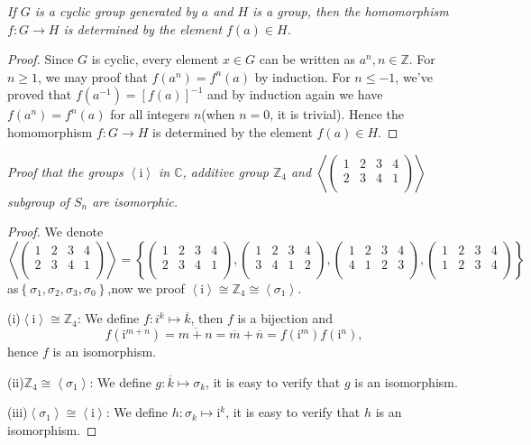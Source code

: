\begin{problem}\em
If $G$ is a cyclic group generated by $a$ and $H$ is a group, then the homomorphism $f:G\to H$ is determined by the element $f(a)\in H$.
\end{problem}
\begin{proof}
Since $G$ is cyclic, every element $x\in G$ can be written as $a^n,n\in\mathbb{Z}$. For $n\ge 1$, we may proof that $f(a^n)=f^n(a)$ by induction. For $n\le -1$, we've proved that $f(a^{-1})=[f(a)]^{-1}$ and by induction again we have $f(a^n)=f^n(a)$ for all integers $n$(when $n=0$, it is trivial). Hence the homomorphism $f:G\to H$ is determined by the element $f(a)\in H$.
\end{proof}
\begin{problem}\em
Proof that the groups $\left<\mathrm{i}\right>$ in $\mathbb{C}$, additive group $\mathbb{Z}_4$ and $
\left< \left( \begin{matrix}
	1&		2&		3&		4\\
	2&		3&		4&		1\\
\end{matrix} \right) \right> 
$
 subgroup of $S_n$ are isomorphic.
\end{problem}
\begin{proof}
We denote 
$$
\left< \left( \begin{matrix}
	1&		2&		3&		4\\
	2&		3&		4&		1\\
\end{matrix} \right) \right> =\left\{ \left( \begin{matrix}
	1&		2&		3&		4\\
	2&		3&		4&		1\\
\end{matrix} \right) ,\left( \begin{matrix}
	1&		2&		3&		4\\
	3&		4&		1&		2\\
\end{matrix} \right) ,\left( \begin{matrix}
	1&		2&		3&		4\\
	4&		1&		2&		3\\
\end{matrix} \right) ,\left( \begin{matrix}
	1&		2&		3&		4\\
	1&		2&		3&		4\\
\end{matrix} \right) \right\}
$$
as$\left\{ \sigma _1,\sigma _2,\sigma _3,\sigma _0 \right\} $,now we proof $\left< \mathrm{i} \right> \cong \mathbb{Z} _4\cong \left< \sigma _1 \right> $.\par
(i)$\left<\mathrm{i}\right>\cong\mathbb{Z}_4$: We define $f:i^k\mapsto\overline{k}$, then $f$ is a bijection and 
$$f(\mathrm{i}^{m+n})=\overline{m+n}=\overline{m}+\overline{n}=f(\mathrm{i}^m)f(\mathrm{i}^n),$$
hence $f$ is an isomorphism.\par
(ii)$\mathbb{Z}_4\cong\left<\sigma_1\right>$: We define $g:\overline{k}\mapsto\sigma_k$, it is easy to verify that $g$ is an isomorphism.\par
(iii)$\left<\sigma_1\right>\cong\left<\mathrm{i}\right>$: We define $h:\sigma_k\mapsto\mathrm{i}^k$, it is easy to verify that $h$ is an isomorphism.
\end{proof}
